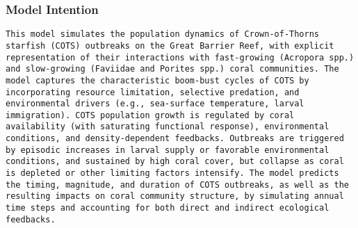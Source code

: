 \subsubsection{Model Intention}
\begin{lstlisting}
This model simulates the population dynamics of Crown-of-Thorns starfish (COTS) outbreaks on the Great Barrier Reef, with explicit representation of their interactions with fast-growing (Acropora spp.) and slow-growing (Faviidae and Porites spp.) coral communities. The model captures the characteristic boom-bust cycles of COTS by incorporating resource limitation, selective predation, and environmental drivers (e.g., sea-surface temperature, larval immigration). COTS population growth is regulated by coral availability (with saturating functional response), environmental conditions, and density-dependent feedbacks. Outbreaks are triggered by episodic increases in larval supply or favorable environmental conditions, and sustained by high coral cover, but collapse as coral is depleted or other limiting factors intensify. The model predicts the timing, magnitude, and duration of COTS outbreaks, as well as the resulting impacts on coral community structure, by simulating annual time steps and accounting for both direct and indirect ecological feedbacks.
\end{lstlisting}

